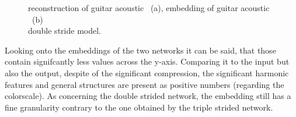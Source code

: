 \begin{figure}[htb!]
    \centering
    \captionsetup{justification=centering}
    \caption{reconstruction of guitar acoustic ~(a), embedding of guitar acoustic ~(b)\\double stride model.}
    \label{fig:res_double_str_2D_output_emb}
\end{figure}

Looking onto the embeddings of the two networks it can be said, that those contain signifcantly less values across the y-axis. Comparing it to the input but also the output, despite of the significant compression, the significant harmonic features and general structures are present as positive numbers (regarding the colorscale). As concerning the double strided network, the embedding still has a fine granularity contrary to the one obtained by the triple strided network.

